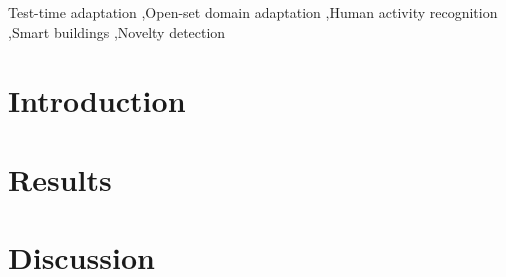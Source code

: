 \documentclass[a4paper,fleqn]{cas-dc}
\begin{document}
\let\WriteBookmarks\relax
\def\floatpagepagefraction{1}
\def\textpagefraction{.001}




\author[1]{Mariem Kbaier}

\author[1]{Ons Abderrahim}

\author[1]{Manar Amayri}

\author[1]{Nizar Bouguila}
\cormark[1]



\begin{keywords}
Test-time adaptation \sep Open-set domain adaptation \sep Human activity recognition
\sep Smart buildings \sep Novelty detection
\end{keywords}

\maketitle

\section{Introduction}
\label{sec:os-intro}



\section{Results}
\label{sec:os-res}









\section{Discussion}

\end{document}
